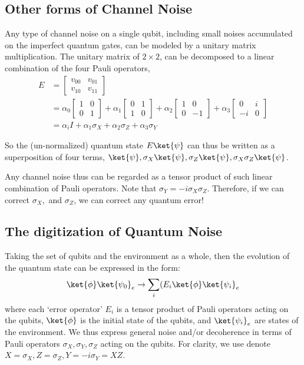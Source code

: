 \subsection{Other forms of Channel Noise}
Any type of channel noise on a single qubit, including small noises accumulated on the imperfect quantum gates, can be modeled by a unitary matrix multiplication. The unitary matrix of \(2\times 2\), can be decomposed to a linear combination of the four Pauli operators,
\begin{align*}
    E &= \begin{bmatrix}v_{00}&v_{01}\\v_{10}&v_{11}\end{bmatrix} \\
    &= \alpha_0 \begin{bmatrix}1 &0\\0&1\end{bmatrix} + \alpha_1 \begin{bmatrix}0 &1\\1&0\end{bmatrix} + \alpha_2 \begin{bmatrix}1 &0\\0&-1\end{bmatrix} + \alpha_3 \begin{bmatrix}0 &i\\-i&0\end{bmatrix} \\
    &= \alpha_i I + \alpha_1 \sigma_X + \alpha_2 \sigma_Z + \alpha_3 \sigma_Y
\end{align*}

So the (un-normalized) quantum state \(E\ket{\psi}\) can thus be written as a superposition of four terms, \(\ket{\psi}, \sigma_X\ket{\psi}, \sigma_Z\ket{\psi}, \sigma_X\sigma_Z\ket{\psi}\).


Any channel noise thus can be regarded as a tensor product of such linear combination of Pauli operators.  Note that \(\sigma_Y = -i \sigma_X \sigma_Z \). Therefore,  
if we can correct \(\sigma_X,\) and \(\sigma_Z\), we can correct any quantum error!

\subsection{The digitization of Quantum Noise}
Taking the set of qubits and the environment as a whole, then the evolution of the quantum state can be expressed in the form:
\begin{align}
\ket{\phi}\ket{\psi_{0}}_{e} \rightarrow \sum_i (E_i \ket{\phi}\ket{\psi_{i}}_{e} \label{eq:QuantumNoise}    
\end{align}
where each ‘error operator’ \(E_i\) is a tensor product of Pauli operators acting on the qubits, \(\ket{\phi}\) is the initial state of the qubits, and \(\ket{\psi_i}_e\)  are states of the environment. We thus express general noise and/or decoherence in terms of Pauli operators \(\sigma_X, \sigma_Y, \sigma_Z\) acting on the qubits. For clarity, we use denote \(X= \sigma_X, Z=\sigma_Z, Y=-i\sigma_Y = XZ\).

